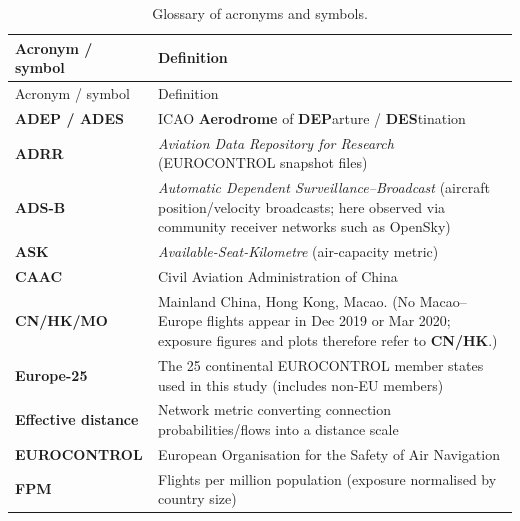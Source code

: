 \documentclass[
  authoryear,
  preprint,
  3p,
  onecolumn]{elsarticle}
\begin{document}
\begin{longtable}[]{@{}
  >{\raggedright\arraybackslash}p{}
  >{\raggedright\arraybackslash}p{}@{}}
\caption{Glossary of acronyms and
symbols.}\label{tbl-glossary}\tabularnewline
\toprule\noalign{}
\begin{minipage}[b]{\linewidth}\raggedright
Acronym / symbol
\end{minipage} & \begin{minipage}[b]{\linewidth}\raggedright
Definition
\end{minipage} \\
\midrule\noalign{}
\endfirsthead
\toprule\noalign{}
\begin{minipage}[b]{\linewidth}\raggedright
Acronym / symbol
\end{minipage} & \begin{minipage}[b]{\linewidth}\raggedright
Definition
\end{minipage} \\
\midrule\noalign{}
\endhead
\bottomrule\noalign{}
\endlastfoot
\textbf{ADEP / ADES} & ICAO \textbf{Aerodrome} of \textbf{DEP}arture /
\textbf{DES}tination \\
\textbf{ADRR} & \emph{Aviation Data Repository for Research}
(EUROCONTROL snapshot files) \\
\textbf{ADS-B} & \emph{Automatic Dependent Surveillance--Broadcast}
(aircraft position/velocity broadcasts; here observed via community
receiver networks such as OpenSky) \\
\textbf{ASK} & \emph{Available-Seat-Kilometre} (air-capacity metric) \\
\textbf{CAAC} & Civil Aviation Administration of China \\
\textbf{CN/HK/MO} & Mainland China, Hong Kong, Macao. (No Macao--Europe
flights appear in Dec 2019 or Mar 2020; exposure figures and plots
therefore refer to \textbf{CN/HK}.) \\
\textbf{Europe-25} & The 25 continental EUROCONTROL member states used
in this study (includes non-EU members) \\
\textbf{Effective distance} & Network metric converting connection
probabilities/flows into a distance scale \\
\textbf{EUROCONTROL} & European Organisation for the Safety of Air
Navigation \\
\textbf{FPM} & Flights per million population (exposure normalised by
country size) \\

\end{longtable}
\end{document}
